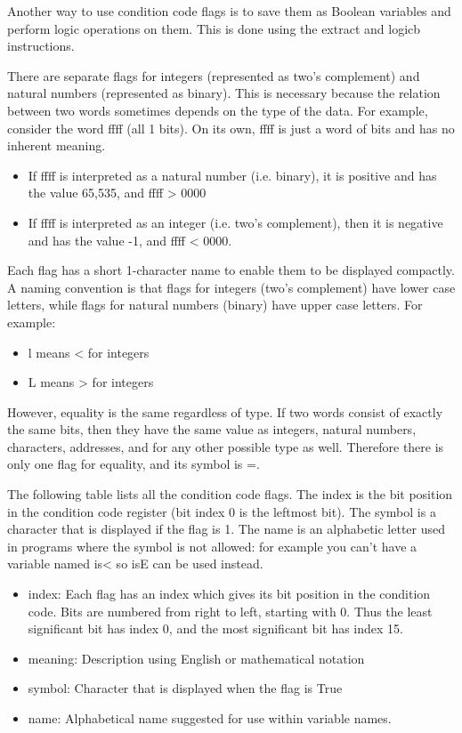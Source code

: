 \documentclass[11pt]{article}
\begin{document}
\begin{itemize}
Another way to use condition code flags is to save them as Boolean
variables and perform logic operations on them.  This is done using
the extract and logicb instructions.

There are separate flags for integers (represented as two's complement) and natural
numbers (represented as binary).  This is necessary because the
relation between two words sometimes depends on the type of the data.
For example, consider the word ffff (all 1 bits).  On its own, ffff is
just a word of bits and has no inherent meaning.
\begin{itemize}
\item If ffff is interpreted as a natural number (i.e. binary), it is
positive and has the value 65,535, and ffff > 0000
\item If ffff is interpreted as an integer (i.e. two's complement), then
it is negative and has the value -1, and ffff < 0000.
\end{itemize}
Each flag has a short 1-character name to enable them to be displayed
compactly.  A naming convention is that flags for integers (two's
complement) have lower case letters, while flags for natural numbers
(binary) have upper case letters.  For example:
\begin{itemize}
\item l means < for integers
\item L means > for integers
\end{itemize}
However, equality is the same regardless of type.  If two words
consist of exactly the same bits, then they have the same value as
integers, natural numbers, characters, addresses, and for any other
possible type as well.  Therefore there is only one flag for equality,
and its symbol is =.

The following table lists all the condition code flags.  The index is
the bit position in the condition code register (bit index 0 is the
leftmost bit).  The symbol is a character that is displayed if the
flag is 1.  The name is an alphabetic letter used in programs where
the symbol is not allowed: for example you can't have a variable named
is< so isE can be used instead.

\begin{itemize}
\item index: Each flag has an index which gives its bit position in the
condition code.  Bits are numbered from right to left, starting
with 0.  Thus the least significant bit has index 0, and the most
significant bit has index 15.
\item meaning: Description using English or mathematical notation
\item symbol: Character that is displayed when the flag is True
\item name: Alphabetical name suggested for use within variable names.
\end{itemize}


\end{itemize}
\end{document}
